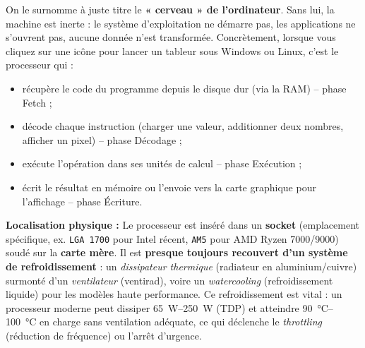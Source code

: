 \documentclass[11pt]{article}
\newcommand{\cle}[1]{{\popxbold\color{popdark}#1}}
\begin{document}
\noindent
On le surnomme à juste titre le \textbf{« cerveau » de l'ordinateur}. Sans lui, la machine est inerte : le système d'exploitation ne démarre pas, les applications ne s'ouvrent pas, aucune donnée n'est transformée. Concrètement, lorsque vous cliquez sur une icône pour lancer un tableur sous Windows ou Linux, c'est le processeur qui :
\begin{itemize}
    \item récupère le code du programme depuis le disque dur (via la RAM) -- phase \cle{Fetch} ;
    \item décode chaque instruction (charger une valeur, additionner deux nombres, afficher un pixel) -- phase \cle{Décodage} ;
    \item exécute l'opération dans ses unités de calcul -- phase \cle{Exécution} ;
    \item écrit le résultat en mémoire ou l'envoie vers la carte graphique pour l'affichage -- phase \cle{Écriture}.
\end{itemize}

\noindent
\textbf{Localisation physique :} Le processeur est inséré dans un \textbf{socket} (emplacement spécifique, ex. \texttt{LGA 1700} pour Intel récent, \texttt{AM5} pour AMD Ryzen 7000/9000) soudé sur la \textbf{carte mère}. Il est \textbf{presque toujours recouvert d'un système de refroidissement} : un \emph{dissipateur thermique} (radiateur en aluminium/cuivre) surmonté d'un \emph{ventilateur} (ventirad), voire un \emph{watercooling} (refroidissement liquide) pour les modèles haute performance. Ce refroidissement est vital : un processeur moderne peut dissiper \SIrange{65}{250}{\watt} (TDP) et atteindre \SIrange{90}{100}{\celsius} en charge sans ventilation adéquate, ce qui déclenche le \emph{throttling} (réduction de fréquence) ou l'arrêt d'urgence.
\end{document}
